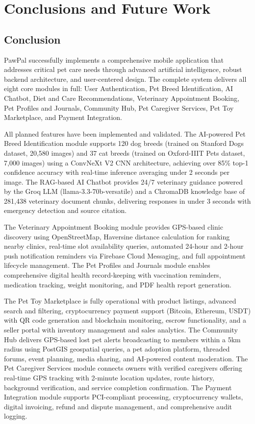 \chapter{Conclusions and Future Work}

\section{Conclusion}
PawPal successfully implements a comprehensive mobile application that addresses critical pet care needs through advanced artificial intelligence, robust backend architecture, and user-centered design. The complete system delivers all eight core modules in full: User Authentication, Pet Breed Identification, AI Chatbot, Diet and Care Recommendations, Veterinary Appointment Booking, Pet Profiles and Journals, Community Hub, Pet Caregiver Services, Pet Toy Marketplace, and Payment Integration.

All planned features have been implemented and validated. The AI-powered Pet Breed Identification module supports 120 dog breeds (trained on Stanford Dogs dataset, 20,580 images) and 37 cat breeds (trained on Oxford-IIIT Pets dataset, 7,000 images) using a ConvNeXt V2 CNN architecture, achieving over 85\% top-1 confidence accuracy with real-time inference averaging under 2 seconds per image. The RAG-based AI Chatbot provides 24/7 veterinary guidance powered by the Groq LLM (llama-3.3-70b-versatile) and a ChromaDB knowledge base of 281,438 veterinary document chunks, delivering responses in under 3 seconds with emergency detection and source citation.

The Veterinary Appointment Booking module provides GPS-based clinic discovery using OpenStreetMap, Haversine distance calculation for ranking nearby clinics, real-time slot availability queries, automated 24-hour and 2-hour push notification reminders via Firebase Cloud Messaging, and full appointment lifecycle management. The Pet Profiles and Journals module enables comprehensive digital health record-keeping with vaccination reminders, medication tracking, weight monitoring, and PDF health report generation.

The Pet Toy Marketplace is fully operational with product listings, advanced search and filtering, cryptocurrency payment support (Bitcoin, Ethereum, USDT) with QR code generation and blockchain monitoring, escrow functionality, and a seller portal with inventory management and sales analytics. The Community Hub delivers GPS-based lost pet alerts broadcasting to members within a 5km radius using PostGIS geospatial queries, a pet adoption platform, threaded forums, event planning, media sharing, and AI-powered content moderation. The Pet Caregiver Services module connects owners with verified caregivers offering real-time GPS tracking with 2-minute location updates, route history, background verification, and service completion confirmation. The Payment Integration module supports PCI-compliant processing, cryptocurrency wallets, digital invoicing, refund and dispute management, and comprehensive audit logging.

